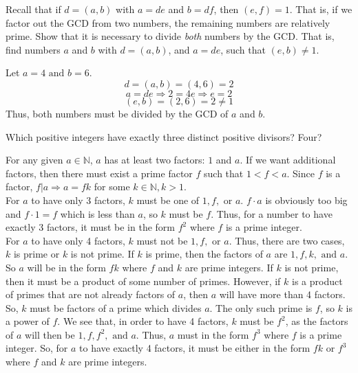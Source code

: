 \documentclass{article}
\begin{document}
\Large
\begin{problem}{}{}
    Recall that if $d = (a, b)$ with $a = de$ and $b = df$, then $(e, f) = 1$. That is, if we factor out the GCD from two numbers, the remaining numbers are relatively prime. Show that it is necessary to divide \textit{both} numbers by the GCD. That is, find numbers $a$ and $b$ with $d=(a,b)$, and $a=de$, such that $(e,b)\neq1$.
\end{problem}
\begin{solution}{}{}
    Let $a=4 \text{ and } b=6$. 
    \[d=(a,b)=(4,6)=2\]
    \[a=de \Rightarrow 2=4e \Rightarrow e=2\]
    \[(e,b)=(2,6)=2\neq1\]
    Thus, both numbers must be divided by the GCD of $a$ and $b$.
\end{solution}

\begin{problem}{}{}
    Which positive integers have exactly three distinct positive divisors? Four?
\end{problem}
\begin{solution}{}{}
    For any given $a\in\mathbb{N}$, $a$ has at least two factors: $1$ and $a$. If we want additional factors, then there must exist a prime factor $f$ such that $1<f<a$. Since $f$ is a factor, $f|a \Rightarrow a=fk$ for some $k\in\mathbb{N},k>1$. \\
    
    For $a$ to have only 3 factors, $k$ must be one of $1,f,\text{ or } a$. $f\cdot a$ is obviously too big and $f\cdot 1=f$ which is less than $a$, so $k$ must be $f$. Thus, for a number to have exactly 3 factors, it must be in the form $f^2$ where $f$ is a prime integer. \\

    For $a$ to have only 4 factors, $k$ must not be $1,f,\text{ or } a$. Thus, there are two cases, $k$ is prime or $k$ is not prime. If $k$ is prime, then the factors of $a$ are $1,f,k, \text{ and } a$. So $a$ will be in the form $fk$ where $f$ and $k$ are prime integers. If $k$ is not prime, then it must be a product of some number of primes. However, if $k$ is a product of primes that are not already factors of $a$, then $a$ will have more than 4 factors. So, $k$ must be factors of a prime which divides $a$. The only such prime is $f$, so $k$ is a power of $f$. We see that, in order to have 4 factors, $k$ must be $f^2$, as the factors of $a$ will then be $1,f,f^2, \text{ and } a$. Thus, $a$ must in the form $f^3$ where $f$ is a prime integer. So, for $a$ to have exactly 4 factors, it must be either in the form $fk$ or $f^3$ where $f$ and $k$ are prime integers.
\end{solution}
\end{document}
